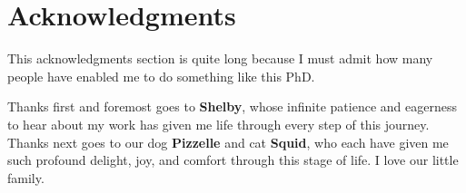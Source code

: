 \documentclass[12pt]{cmuthesis}
\begin{document}




\chapter*{Acknowledgments}
This acknowledgments section is quite long because I must admit how many people have enabled me to do something like this PhD. 

Thanks first and foremost goes to \textbf{Shelby}, whose infinite patience and eagerness to hear about my work has given me life through every step of this journey. Thanks next goes to our dog \textbf{Pizzelle} and cat \textbf{Squid}, who each have given me such profound delight, joy, and comfort through this stage of life. I love our little family.
\end{document}
